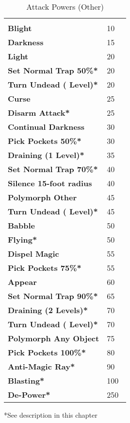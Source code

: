\begin{multicols*}{2}
\begin {table}[H]
  \caption{Attack Powers (Other)}
  \begin{tabularx}{\columnwidth}{>{\bfseries}YY}
   & \\
	Blight & 10\\
	Darkness & 15\\
	Light & 20\\
	Set Normal Trap 50\%* & 20\\
	Turn Undead ( Level)* & 20\\
	Curse & 25\\
	Disarm Attack* & 25\\
	Continual Darkness & 30\\
	Pick Pockets 50\%* & 30\\
	Draining (1 Level)* & 35\\
	Set Normal Trap 70\%* & 40\\
	Silence 15-foot radius & 40\\
	Polymorph Other & 45\\
	Turn Undead ( Level)* & 45\\
	Babble & 50\\
	Flying* & 50\\
	Dispel Magic & 55\\
	Pick Pockets 75\%* & 55\\
	Appear & 60\\
	Set Normal Trap 90\%* & 65\\
	Draining (2 Levels)* & 70\\
	Turn Undead ( Level)* & 70\\
	Polymorph Any Object & 75\\
	Pick Pockets 100\%* & 80\\
	Anti-Magic Ray* & 90\\
	Blasting* & 100\\
	De-Power* & 250\
  \end {tabularx}
	*See description in this chapter
\end {table}


\end{multicols*}
